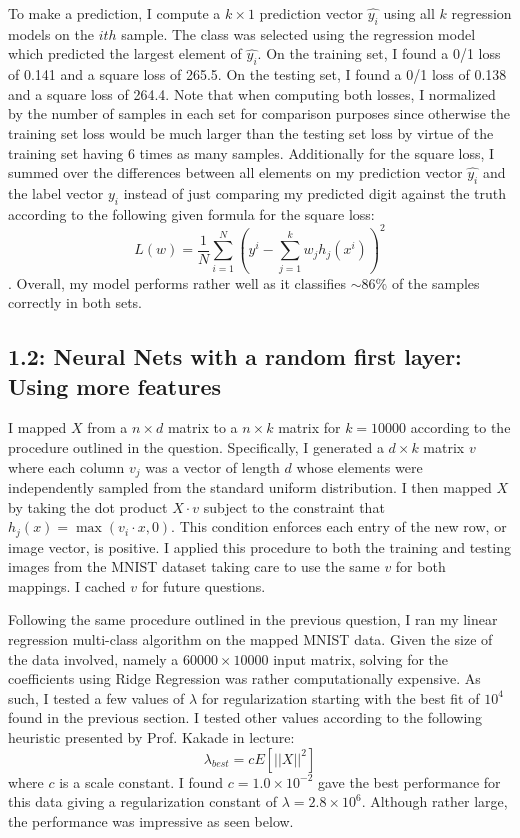\documentclass[12pt]{amsart}
\begin{document}
To make a prediction, I compute a $k \times 1$ prediction vector $\hat{y_i}$ using all $k$ regression models on the $ith$ sample.  The class was selected using the regression model which predicted the largest element of $\hat{y_i}$.  On the training set, I found a 0/1 loss of 0.141 and a square loss of 265.5.  On the testing set, I found a 0/1 loss of 0.138 and a square loss of 264.4.  Note that when computing both losses, I normalized by the number of samples in each set for comparison purposes since otherwise the training set loss would be much larger than the testing set loss by virtue of the training set having 6 times as many samples.  Additionally for the square loss, I summed over the differences between all elements on my prediction vector $\hat{y_i}$ and the label vector $y_i$ instead of just comparing my predicted digit against the truth according to the following given formula for the square loss:
\begin{equation} \label{eqn:square_loss}
L(w) = \frac{1}{N} \sum_{i = 1}^N \left(y^i - \sum_{j = 1}^k w_j h_j(x^i)  \right)^2
\end{equation}.  
Overall, my model performs rather well as it classifies ${\sim}86\%$ of the samples correctly in both sets.

\subsection*{1.2: Neural Nets with a random first layer: Using more features}

I mapped $X$ from a $n \times d$ matrix to a $n \times k$ matrix for $k=10000$ according to the procedure outlined in the question.  Specifically, I generated a $d \times k$ matrix $v$ where each column $v_j$ was a vector of length $d$ whose elements were independently sampled from the standard uniform distribution.  I then mapped $X$ by taking the dot product $X \cdot v$ subject to the constraint that $h_j(x) = \max{(v_i \cdot x,0)}$.  This condition enforces each entry of the new row, or image vector, is positive.  I applied this procedure to both the training and testing images from the MNIST dataset taking care to use the same $v$ for both mappings.  I cached $v$ for future questions.

Following the same procedure outlined in the previous question, I ran my linear regression multi-class algorithm on the mapped MNIST data.  Given the size of the data involved, namely a $60000 \times 10000$ input matrix, solving for the coefficients using Ridge Regression was rather computationally expensive.  As such, I tested a few values of $\lambda$ for regularization starting with the best fit of $10^4$ found in the previous section.  I tested other values according to the following heuristic presented by Prof. Kakade in lecture:
\begin{equation} \label{eqn:lambda_heuristic}
\lambda_{best} = c E[||X||^2]
\end{equation}
where $c$ is a scale constant.  I found $c = 1.0 \times 10^{-2}$ gave the best performance for this data giving a regularization constant of $\lambda = 2.8 \times 10^6$.  Although rather large, the performance was impressive as seen below.
 
\end{document}
